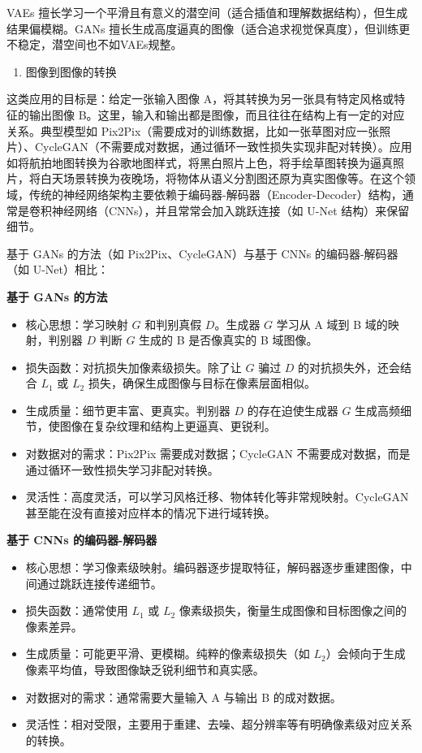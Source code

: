 VAEs 擅长学习一个平滑且有意义的潜空间（适合插值和理解数据结构），但生成结果偏模糊。GANs 擅长生成高度逼真的图像（适合追求视觉保真度），但训练更不稳定，潜空间也不如VAEs规整。

\begin{enumerate}
\def\labelenumi{\arabic{enumi}.}
\setcounter{enumi}{1}
\tightlist
\item
  图像到图像的转换
\end{enumerate}

这类应用的目标是：给定一张输入图像 A，将其转换为另一张具有特定风格或特征的输出图像 B。这里，输入和输出都是图像，而且往往在结构上有一定的对应关系。典型模型如 Pix2Pix（需要成对的训练数据，比如一张草图对应一张照片）、CycleGAN（不需要成对数据，通过循环一致性损失实现非配对转换）。应用如将航拍地图转换为谷歌地图样式，将黑白照片上色，将手绘草图转换为逼真照片，将白天场景转换为夜晚场，将物体从语义分割图还原为真实图像等。在这个领域，传统的神经网络架构主要依赖于编码器-解码器（Encoder-Decoder）结构，通常是卷积神经网络（CNNs），并且常常会加入跳跃连接（如 U-Net 结构）来保留细节。

基于 GANs 的方法（如 Pix2Pix、CycleGAN）与基于 CNNs 的编码器-解码器（如 U-Net）相比：

\textbf{基于 GANs 的方法}

\begin{itemize}
\tightlist
\item
  核心思想：学习映射 \(G\) 和判别真假 \(D\)。生成器 \(G\) 学习从 A 域到 B 域的映射，判别器 \(D\) 判断 \(G\) 生成的 B 是否像真实的 B 域图像。
\item
  损失函数：对抗损失加像素级损失。除了让 \(G\) 骗过 \(D\) 的对抗损失外，还会结合 \(L_1\) 或 \(L_2\) 损失，确保生成图像与目标在像素层面相似。
\item
  生成质量：细节更丰富、更真实。判别器 \(D\) 的存在迫使生成器 \(G\) 生成高频细节，使图像在复杂纹理和结构上更逼真、更锐利。
\item
  对数据对的需求：Pix2Pix 需要成对数据；CycleGAN 不需要成对数据，而是通过循环一致性损失学习非配对转换。
\item
  灵活性：高度灵活，可以学习风格迁移、物体转化等非常规映射。CycleGAN 甚至能在没有直接对应样本的情况下进行域转换。
\end{itemize}

\textbf{基于 CNNs 的编码器-解码器}

\begin{itemize}
\tightlist
\item
  核心思想：学习像素级映射。编码器逐步提取特征，解码器逐步重建图像，中间通过跳跃连接传递细节。
\item
  损失函数：通常使用 \(L_1\) 或 \(L_2\) 像素级损失，衡量生成图像和目标图像之间的像素差异。
\item
  生成质量：可能更平滑、更模糊。纯粹的像素级损失（如 \(L_2\)）会倾向于生成像素平均值，导致图像缺乏锐利细节和真实感。
\item
  对数据对的需求：通常需要大量输入 A 与输出 B 的成对数据。
\item
  灵活性：相对受限，主要用于重建、去噪、超分辨率等有明确像素级对应关系的转换。
\end{itemize}

